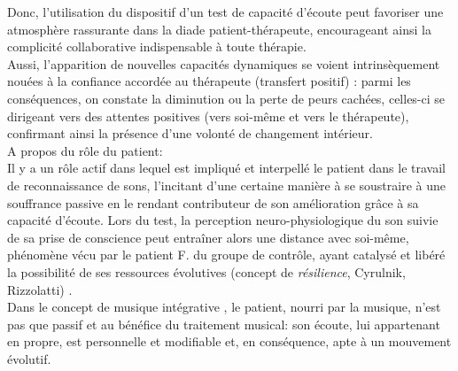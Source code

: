 \begin{itemize}
  	Donc, l'utilisation
  	du dispositif d'un test de capacité d'écoute peut favoriser une atmosphère rassurante dans la diade
  	patient-thérapeute, encourageant ainsi la complicité collaborative
  	indispensable à toute
  	thérapie.
  	  \\
  	   Aussi, l'apparition de nouvelles
  	  capacités  dynamiques se voient intrinsèquement nouées à la confiance
  	  accordée au thérapeute (transfert positif)
  	  \autocite{roustang1986} : parmi les conséquences, on constate la
  	  diminution ou la perte de peurs cachées, celles-ci se dirigeant vers des
  	  attentes positives (vers soi-même et vers le thérapeute), confirmant ainsi la
  	  présence d'une volonté de changement intérieur.
  	  	  \\
  	 A propos du rôle du patient: 
  	 	  \\
  		 Il y a  un rôle actif dans lequel est impliqué et interpellé le patient dans le travail
  	de reconnaissance de sons, l'incitant d'une certaine manière  à se soustraire à une souffrance
  	passive en  le rendant  contributeur de son amélioration grâce à sa capacité
  	d'écoute.
  	Lors du test, la perception
  	neuro-physiologique du son suivie de sa prise de conscience
  	peut entraîner alors une distance avec
  	soi-même, phénomène vécu  par 
  	le patient F.  du groupe de contrôle, ayant catalysé et libéré
  	la possibilité de ses ressources évolutives (concept de \textit{résilience}, Cyrulnik, Rizzolatti) 
  	\autocite[27--63]{van_eersel_cerveau}.
  	 \\
  	  Dans le concept de musique intégrative \autocite{vrait_musicotherapie_2018},  le patient, nourri par
  	 la musique, n'est pas que passif et
  	 au bénéfice  du traitement musical: son écoute, lui
  	 appartenant en propre, est personnelle et modifiable %
  	 et, en conséquence, apte à un mouvement évolutif.
  	  

\end{itemize}

